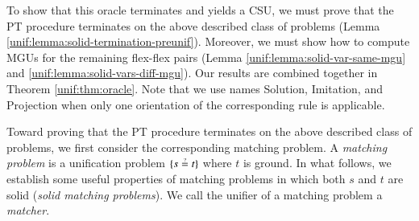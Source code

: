To show that this oracle terminates and yields a CSU, we must prove that the PT
procedure terminates on the above described class of problems (Lemma
\ref{unif:lemma:solid-termination-preunif}). Moreover, we must show how to compute MGUs for
the remaining flex-flex pairs (Lemma \ref{unif:lemma:solid-var-same-mgu} and
\ref{unif:lemma:solid-vars-diff-mgu}). Our results are combined together in Theorem
\ref{unif:thm:oracle}. Note that we use names \textsf{Solution}, \textsf{Imitation}, and
\textsf{Projection} when only one orientation of the corresponding rule is applicable.



Toward proving that the PT
procedure terminates on the above described class of problems, we first consider the corresponding matching problem.
A \emph{matching problem} is a unification problem
$\{ s \unif t \}$ where $t$ is ground. In what
follows, we establish some useful properties of matching problems in which both
$s$ and $t$ are solid (\emph{solid matching problems}). We call the unifier
of a matching problem a \emph{matcher}.


